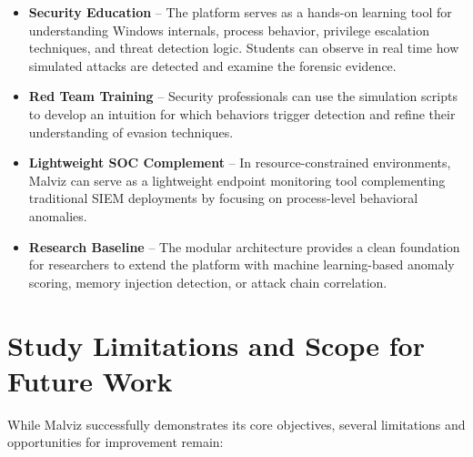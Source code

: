 \begin{itemize}
    \item \textbf{Security Education} -- The platform serves as a hands-on learning tool for understanding Windows internals, process behavior, privilege escalation techniques, and threat detection logic. Students can observe in real time how simulated attacks are detected and examine the forensic evidence.

    \item \textbf{Red Team Training} -- Security professionals can use the simulation scripts to develop an intuition for which behaviors trigger detection and refine their understanding of evasion techniques.

    \item \textbf{Lightweight SOC Complement} -- In resource-constrained environments, Malviz can serve as a lightweight endpoint monitoring tool complementing traditional SIEM deployments by focusing on process-level behavioral anomalies.

    \item \textbf{Research Baseline} -- The modular architecture provides a clean foundation for researchers to extend the platform with machine learning-based anomaly scoring, memory injection detection, or attack chain correlation.
\end{itemize}

\section{Study Limitations and Scope for Future Work}

While Malviz successfully demonstrates its core objectives, several limitations and opportunities for improvement remain:

